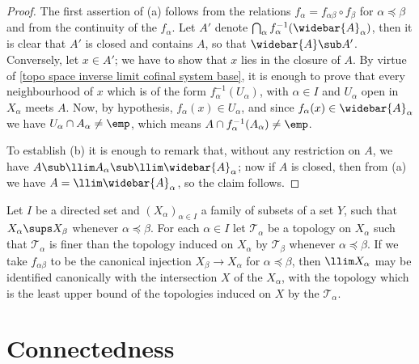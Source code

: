 \begin{proof}
The first assertion of (a) follows from the relations $f_\alpha=f_{\alpha\beta}\circ f_\beta$ for $\alpha\preceq\beta$ and from the continuity of the $f_\alpha$. Let $A'$ denote $\bigcap_{\alpha}f_\alpha^{-1}(\widebar{A}_\alpha)$, then it is clear that $A'$ is closed and contains $A$, so that $\widebar{A}\sub A'$. Conversely, let $x\in A'$; we have to show that $x$ lies in the closure of $A$. By virtue of \cref{topo space inverse limit cofinal system base}, it is enough to prove that every neighbourhood of $x$ which is of the form $f_\alpha^{-1}(U_\alpha)$, with $\alpha\in I$ and $U_\alpha$ open in $X_\alpha$ meets $A$. Now, by hypothesis, $f_\alpha(x)\in U_\alpha$, and since $f_\alpha(x)\in \widebar{A}_\alpha$ we have $U_\alpha\cap A_\alpha\neq\emp$, which means $A\cap f_\alpha^{-1}(A_\alpha)\neq\emp$.\par
To establish (b) it is enough to remark that, without any restriction on $A$, we have $A\sub\llim A_\alpha\sub\llim\widebar{A}_\alpha$; now if $A$ is closed, then from (a) we have $A=\llim\widebar{A}_\alpha$, so the claim follows.
\end{proof}
\begin{example}
Let $I$ be a directed set and $(X_\alpha)_{\alpha\in I}$ a family of subsets of a set $Y$, such that $X_\alpha\sups X_\beta$ whenever $\alpha\preceq\beta$. For each $\alpha\in I$ let $\mathcal{T}_\alpha$ be a topology on $X_\alpha$ such that $\mathcal{T}_\alpha$ is finer than the topology induced on $X_\alpha$ by $\mathcal{T}_\beta$ whenever $\alpha\preceq\beta$. If we take $f_{\alpha\beta}$ to be the canonical injection $X_\beta\to X_\alpha$ for $\alpha\preceq\beta$, then $\llim X_\alpha$ may be identified canonically with the intersection $X$ of the $X_\alpha$, with the topology which is the least upper bound of the topologies induced on $X$ by the $\mathcal{T}_\alpha$.
\end{example}
\section{Connectedness}
